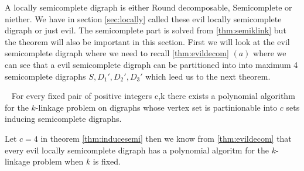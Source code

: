 A locally semicomplete digraph is either Round decomposable, Semicomplete or niether.
We have in section \autoref{sec:locally} called these evil locally semicomplete digraph or just evil.
The semicomplete part is solved from \autoref{thm:semiklink} but the theorem will also be important in this section.
First we will look at the evil semicomplete digraph where we need to recall \autoref{thm:evildecom} $(a)$ where we can see that a evil semicomplete digraph can be partitioned into into maximum 4 semicomplete digraphs $S,D_1',D_2',D_3'$ which leed us to the next theorem.
\begin{thm}~\cite{chudnovskyJCT135}
    For every fixed pair of positive integers c,k there exists a polynomial algorithm for the $k$-linkage problem on digraphs whose vertex set is partinionable into $c$ sets inducing semicomplete digraphs.
    \label{thm:inducesemi}
\end{thm}
Let $c=4$ in theorem \autoref{thm:inducesemi} then we know from \autoref{thm:evildecom} that every evil locally semicomplete digraph has a polynomial algoritm for the $k$-linkage problem when $k$ is fixed.\\

